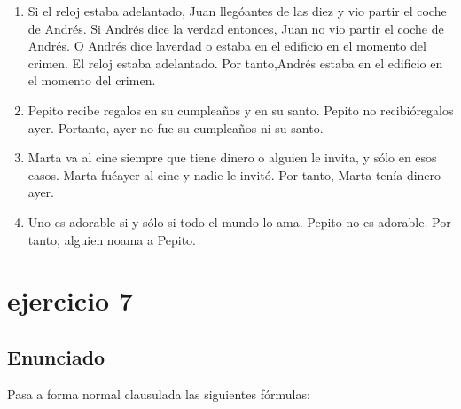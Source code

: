 \documentclass[a4paper,10pt]{article}
\begin{document}
\begin{enumerate}
	\item Si el reloj estaba adelantado, Juan llegóantes de las diez y vio partir el coche de Andrés. Si Andrés   dice   la   verdad   entonces,   Juan   no   vio   partir   el   coche   de   Andrés.   O   Andrés   dice   laverdad o estaba en el edificio en el momento del crimen. El reloj estaba adelantado. Por tanto,Andrés estaba en el edificio en el momento del crimen.

	\item Pepito  recibe   regalos  en  su  cumpleaños  y  en  su  santo.  Pepito   no  recibióregalos   ayer.  Portanto, ayer no fue su cumpleaños ni su santo.

	\item Marta va al cine siempre que tiene dinero o alguien le invita, y sólo en esos
	casos. Marta fuéayer al cine y nadie le invitó. Por tanto, Marta tenía dinero ayer.

	\item Uno es adorable si y sólo si todo el mundo lo ama. Pepito no es adorable. Por tanto, alguien noama a Pepito.

\end{enumerate}


\vspace{1cm}
\section{ejercicio 7}
\subsection{Enunciado}
Pasa a forma normal clausulada las siguientes fórmulas:
\end{document}

